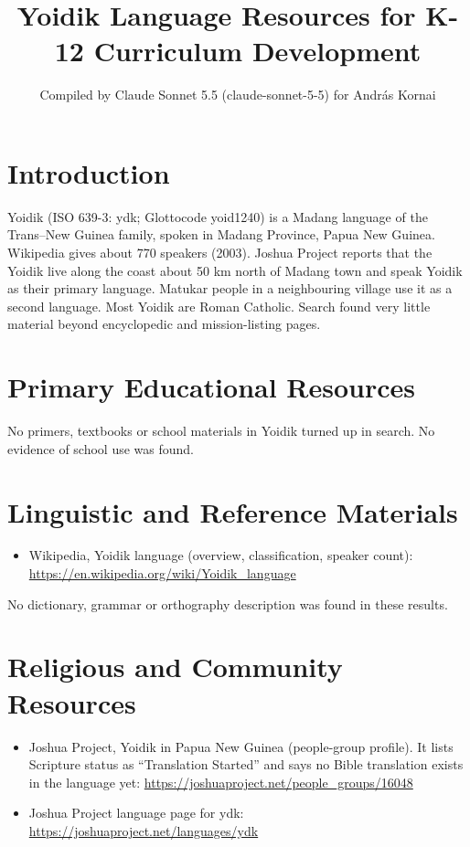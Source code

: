 \documentclass[12pt]{article}
\title{Yoidik Language Resources for K-12 Curriculum Development}
\author{Compiled by Claude Sonnet 5.5 (claude-sonnet-5-5) for Andr\'as Kornai}
\date{}
\begin{document}
\maketitle

\section{Introduction}
Yoidik (ISO 639-3: ydk; Glottocode yoid1240) is a Madang language of the Trans--New Guinea family, spoken in Madang Province, Papua New Guinea. Wikipedia gives about 770 speakers (2003). Joshua Project reports that the Yoidik live along the coast about 50 km north of Madang town and speak Yoidik as their primary language. Matukar people in a neighbouring village use it as a second language. Most Yoidik are Roman Catholic. Search found very little material beyond encyclopedic and mission-listing pages.

\section{Primary Educational Resources}
No primers, textbooks or school materials in Yoidik turned up in search. No evidence of school use was found.

\section{Linguistic and Reference Materials}
\begin{itemize}
\item Wikipedia, Yoidik language (overview, classification, speaker count): \url{https://en.wikipedia.org/wiki/Yoidik_language}
\end{itemize}
No dictionary, grammar or orthography description was found in these results.

\section{Religious and Community Resources}
\begin{itemize}
\item Joshua Project, Yoidik in Papua New Guinea (people-group profile). It lists Scripture status as ``Translation Started'' and says no Bible translation exists in the language yet: \url{https://joshuaproject.net/people_groups/16048}
\item Joshua Project language page for ydk: \url{https://joshuaproject.net/languages/ydk}
\end{itemize}
\end{document}
